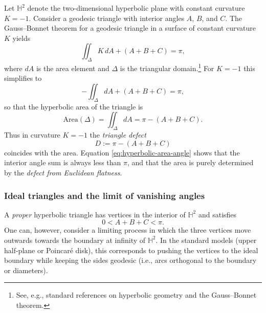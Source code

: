 \documentclass[10pt,reprint,aps,onecolumn,nofootinbib]{revtex4-2}
\begin{document}
        Let $\mathbb{H}^2$ denote the two-dimensional hyperbolic plane with constant curvature $K=-1$. Consider a geodesic triangle with interior angles $A$, $B$, and $C$. The Gauss--Bonnet theorem for a geodesic triangle in a surface of constant curvature $K$ yields
        \begin{equation}
            \iint_{\Delta} K \, dA + (A + B + C) = \pi,
        \end{equation}
        where $dA$ is the area element and $\Delta$ is the triangular domain.\footnote{See, e.g., standard references on hyperbolic geometry and the Gauss--Bonnet theorem.\cite{doCarmo-diff-geom-2016,Ratcliffe-hyperbolic-2006,Thurston-3manifolds-1997}}
        For $K=-1$ this simplifies to
        \begin{equation}
            - \iint_{\Delta} dA + (A + B + C) = \pi,
        \end{equation}
        so that the hyperbolic area of the triangle is
        \begin{equation}
            \text{Area}(\Delta)
            = \iint_{\Delta} dA
            = \pi - (A + B + C).
            \label{eq:hyperbolic-area-angle}
        \end{equation}
        Thus in curvature $K = -1$ the \emph{triangle defect}
        \begin{equation}
            D := \pi - (A + B + C)
        \end{equation}
        coincides with the area. Equation \eqref{eq:hyperbolic-area-angle} shows that the interior angle sum is always less than $\pi$, and that the area is purely determined by the \emph{defect from Euclidean flatness}.

    \subsubsection{Ideal triangles and the limit of vanishing angles}

        A \emph{proper} hyperbolic triangle has vertices in the interior of $\mathbb{H}^2$ and satisfies
        \begin{equation}
            0 < A + B + C < \pi.
        \end{equation}
        One can, however, consider a limiting process in which the three vertices move outwards towards the boundary at infinity of $\mathbb{H}^2$. In the standard models (upper half-plane or Poincar\'e disk), this corresponds to pushing the vertices to the ideal boundary while keeping the sides geodesic (i.e., arcs orthogonal to the boundary or diameters).
\end{document}
